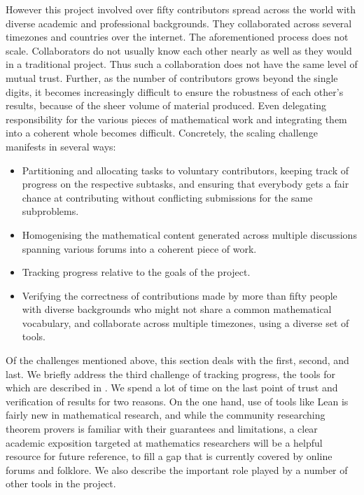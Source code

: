 However this project involved over fifty contributors spread across the world with diverse academic and professional backgrounds. They collaborated across several timezones and countries over the internet. The aforementioned process does not scale. Collaborators do not usually know each other nearly as well as they would in a traditional project. Thus such a collaboration does not have the same level of mutual trust. Further, as the number of contributors grows beyond the single digits, it becomes increasingly difficult to ensure the robustness of each other's results, because of the sheer volume of material produced. Even delegating responsibility for the various pieces of mathematical work and integrating them into a coherent whole becomes difficult. Concretely, the scaling challenge manifests in several ways:
\begin{itemize}
    \item Partitioning and allocating tasks to voluntary contributors, keeping track of progress on the respective subtasks, and ensuring that everybody gets a fair chance at contributing without conflicting submissions for the same subproblems.
    \item Homogenising the mathematical content generated across multiple discussions spanning various forums into a coherent piece of work.
    \item Tracking progress relative to the goals of the project.
    \item Verifying the correctness of contributions made by more than fifty people with diverse backgrounds who might not share a common mathematical vocabulary, and collaborate across multiple timezones, using a diverse set of tools.
\end{itemize}

Of the challenges mentioned above, this section deals with the first, second, and last. We briefly address the third challenge of tracking progress, the tools for which are described in . We spend a lot of time on the last point of trust and verification of results for two reasons. On the one hand, use of tools like Lean is fairly new in mathematical research, and while the community researching theorem provers is familiar with their guarantees and limitations, a clear academic exposition targeted at mathematics researchers will be a helpful resource for future reference, to fill a gap that is currently covered by online forums and folklore. We also describe the important role played by a number of other tools in the project.

